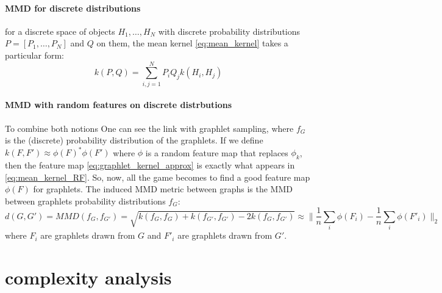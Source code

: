 \paragraph{MMD for discrete distributions}
for a discrete space of objects $H_1, \ldots, H_N$ with discrete probability distributions $P = [P_1, \ldots, P_N]$ and $Q$ on them, the mean kernel \ref{eq:mean_kernel} takes a particular form:
\[
k(P,Q) = \sum_{i,j=1}^N P_i Q_j k(H_i, H_j)
\]

\paragraph{MMD with random features on discrete distrbutions}

To combine both notions One can see the link with graphlet sampling, where $f_G$ is the (discrete) probability distribution of the graphlets. If we define $k(F, F') \approx \phi(F)^*\phi(F')$ where $\phi$ is a random feature map that replaces $\phi_k$, then the feature map \eqref{eq:graphlet_kernel_approx} is exactly what appears in \eqref{eq:mean_kernel_RF}. So, now, all the game becomes to find a good feature map $\phi(F)$ for graphlets. The induced MMD metric between graphs is the MMD between graphlets probability distributions $f_G$:
\[
d(G,G') = MMD(f_G, f_{G'}) = \sqrt{k(f_G, f_{G}) + k(f_{G'}, f_{G'}) - 2 k(f_G, f_{G'})} \approx \| \frac{1}{n} \sum_i \phi(F_i) - \frac{1}{n} \sum_i \phi(F'_i)\|_2
\]
where $F_i$ are graphlets drawn from $G$ and $F'_i$ are graphlets drawn from $G'$.



\section{complexity analysis}

